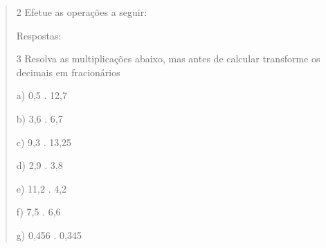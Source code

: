 \begin{quote}

\num{2} Efetue as operações a seguir:










Respostas:









\num{3} Resolva as multiplicações abaixo, mas antes de calcular transforme os
decimais em fracionários

a) 0,5 . 12,7

b) 3,6 . 6,7

c) 9,3 . 13,25

d) 2,9 . 3,8

e) 11,2 . 4,2

f) 7,5 . 6,6

g) 0,456 . 0,345


\end{quote}
